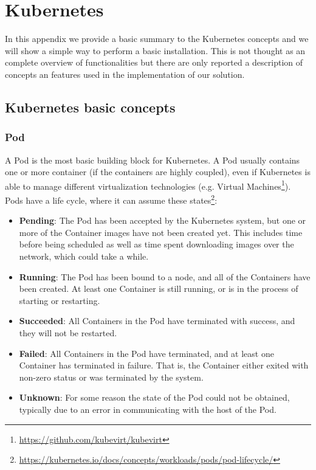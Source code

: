 \chapter{Kubernetes}
\label{kubernetes}

In this appendix we provide a basic summary to the Kubernetes concepts and
we will show a simple way to perform a basic installation. This is not thought 
as an complete overview of functionalities but there are only reported a 
description of concepts an features used in the implementation of our solution. 

\section{Kubernetes basic concepts}
\label{kubernetes-basic-concepts}

\subsection{Pod}
\label{pod}

A Pod is the most basic building block for Kubernetes. A Pod usually
contains one or more container (if the containers are highly coupled),
even if Kubernetes is able to manage different virtualization technologies
(e.g. Virtual Machines\footnote{\url{https://github.com/kubevirt/kubevirt}}).
Pods have a life cycle, where it can assume these
states\footnote{
\url{https://kubernetes.io/docs/concepts/workloads/pods/pod-lifecycle/}}:
\begin{itemize}
\item \textbf{Pending}: The Pod has been accepted by the Kubernetes system,
  but one or more of the Container images have not been created yet. This
  includes time before being scheduled as well as time spent downloading
  images over the network, which could take a while.
\item \textbf{Running}: The Pod has been bound to a node, and all of the
  Containers have been created. At least one Container is still running,
  or is in the process of starting or restarting.
\item \textbf{Succeeded}: All Containers in the Pod have terminated with
  success, and they will not be restarted.
\item \textbf{Failed}: All Containers in the Pod have terminated, and at
  least one Container has terminated in failure. That is, the Container
  either exited with non-zero status or was terminated by the system.
\item \textbf{Unknown}: For some reason the state of the Pod could not be
  obtained, typically due to an error in communicating with the host of
  the Pod.
\end{itemize}

